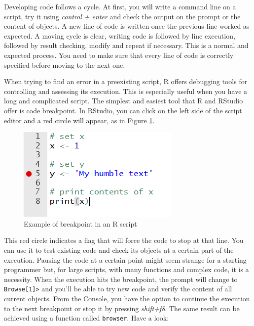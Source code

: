 \documentclass[
  12pt,
]{book}
\begin{document}
Developing code follows a cycle. At first, you will write a command line on a script, try it using \emph{control + enter} and check the output on the prompt or the content of objects. A new line of code is written once the previous line worked as expected. A moving cycle is clear, writing code is followed by line execution, followed by result checking, modify and repeat if necessary. This is a normal and expected process. You need to make sure that every line of code is correctly specified before moving to the next one.

When trying to find an error in a preexisting script, R offers debugging tools for controlling and assessing its execution. This is especially useful when you have a long and complicated script. The simplest and easiest tool that R and RStudio offer is code breakpoint. In RStudio, you can click on the left side of the script editor and a red circle will appear, as in Figure \ref{fig:example-debug}.

\begin{figure}[!htbp]

{\centering \includegraphics[width=0.75\linewidth]{figs/RStudio_example_debug} 

}

\caption{Example of breakpoint in an R script}\label{fig:example-debug}
\end{figure}

This red circle indicates a flag that will force the code to stop at that line. You can use it to test existing code and check its objects at a certain part of the execution. Pausing the code at a certain point might seem strange for a starting programmer but, for large scripts, with many functions and complex code, it is a necessity. When the execution hits the breakpoint, the prompt will change to \texttt{Browse{[}1{]}\textgreater{}} and you'll be able to try new code and verify the content of all current objects. From the Console, you have the option to continue the execution to the next breakpoint or stop it by pressing \emph{shift+f8}. The same result can be achieved using a function called \texttt{browser}. Have a look:
\end{document}
